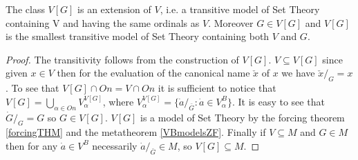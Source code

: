 \begin{proposition} The class $V[G]$ is an extension of $V$, i.e. a transitive model of Set Theory containing V and
having the same ordinals as $V$. Moreover $G\in V[G]$ and $V[G]$ is the smallest transitive model of Set Theory containing
both $V$ and $G$.
\end{proposition}
\begin{proof} The transitivity follows from the construction of $V[G]$. $V\subseteq V[G]$ since given
 $x\in V$ then for the evaluation of the canonical name $\check{x}$ of $x$ we have $\check{x}/_{G} = x$.
 To see that $V[G]\cap On = V\cap On$ it is sufficient to notice that $V[G]=\bigcup_{\alpha \in On}V_\alpha^{V[G]}$,
 where $V_\alpha^{V[G]}=\{\dot{a}/_{\bar{G}}:\dot{a}\in V_\alpha^B\}$. It is easy to see that $\dot{G}/_{G}=G$ so $G\in V[G]$.
 $V[G]$ is a model of Set Theory by the forcing theorem \ref{forcingTHM} and the metatheorem \ref{VBmodelsZF}. Finally if $V\subseteq M$ and
 $G\in M$ then for any $\dot{a}\in V^B$ necessarily $\dot{a}/_{\bar{G}}\in M$, so $V[G]\subseteq M$.
\end{proof}

